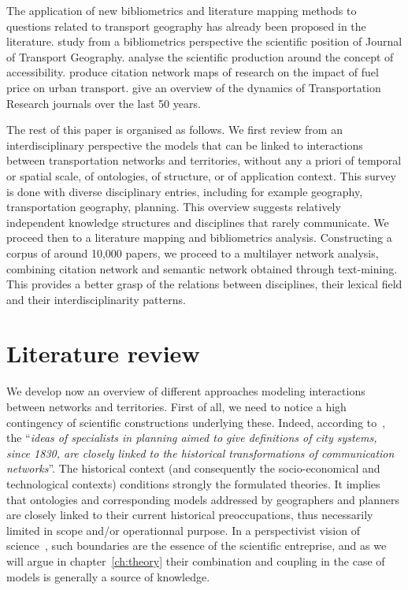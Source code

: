 \documentclass[10pt]{article}
\begin{document}
The application of new bibliometrics and literature mapping methods to questions related to transport geography has already been proposed in the literature. \cite{derudder2019shifting} study from a bibliometrics perspective the scientific position of Journal of Transport Geography. \cite{shi2020literature} analyse the scientific production around the concept of accessibility. \cite{leung2019fuel} produce citation network maps of research on the impact of fuel price on urban transport. \cite{modak2019fifty} give an overview of the dynamics of Transportation Research journals over the last 50 years.



The rest of this paper is organised as follows. We first review from an interdisciplinary perspective the models that can be linked to interactions between transportation networks and territories, without any a priori of temporal or spatial scale, of ontologies, of structure, or of application context. This survey is done with diverse disciplinary entries, including for example geography, transportation geography, planning. This overview suggests relatively independent knowledge structures and disciplines that rarely communicate. We proceed then to a literature mapping and bibliometrics analysis. Constructing a corpus of around 10,000 papers, we proceed to a multilayer network analysis, combining citation network and semantic network obtained through text-mining. This provides a better grasp of the relations between disciplines, their lexical field and their interdisciplinarity patterns.




\section{Literature review}



We develop now an overview of different approaches modeling interactions between networks and territories. First of all, we need to notice a high contingency of scientific constructions underlying these. Indeed, according to~\cite{bretagnolle2002time}, the ``\textit{ideas of specialists in planning aimed to give definitions of city systems, since 1830, are closely linked to the historical transformations of communication networks}''. The historical context (and consequently the socio-economical and technological contexts) conditions strongly the formulated theories. It implies that ontologies and corresponding models addressed by geographers and planners are closely linked to their current historical preoccupations, thus necessarily limited in scope and/or operationnal purpose. In a perspectivist vision of science~\cite{giere2010scientific}, such boundaries are the essence of the scientific entreprise, and as we will argue in chapter~\ref{ch:theory} their combination and coupling in the case of models is generally a source of knowledge.
\end{document}

